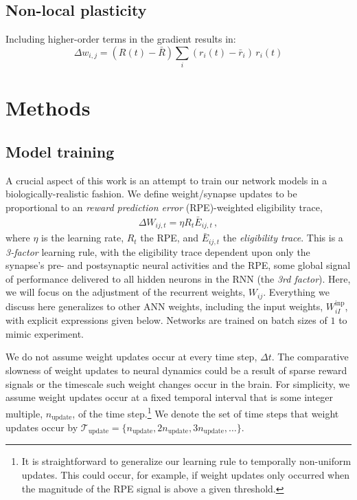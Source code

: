 \documentclass[
  journal=medium,
  manuscript=preprint,
  year=2026
]{aind-preprint}
\begin{document}
\subsection{Non-local plasticity}
Including higher-order terms in the gradient results in:
\begin{equation}
    \Delta w_{i,j} = (R(t)-\bar{R})\sum_i (r_i(t) -\bar{r}_i)\,r_{i}(t)
\end{equation}


\section{Methods}

\subsection{Model training}

A crucial aspect of this work is an attempt to train our network models in a biologically-realistic fashion.
We define weight/synapse updates to be proportional to an \emph{reward prediction error} (RPE)-weighted eligibility trace,
\begin{align}
    \label{eq:methods_weight_adjust}
    \Delta W_{ij,t} = \eta R_t \bar{E}_{ij,t}\,,
\end{align}
where $\eta$ is the learning rate, $R_t$ the RPE, and $\bar{E}_{ij,t}$ the \emph{eligibility trace}.
This is a \emph{3-factor} learning rule, with the eligibility trace dependent upon only the synapse's pre- and postsynaptic neural activities and the RPE, some global signal of performance delivered to all hidden neurons in the RNN (the \emph{3rd factor}).
Here, we will focus on the adjustment of the recurrent weights, $W_{ij}$. 
Everything we discuss here generalizes to other ANN weights, including the input weights, $W_{iI}^\text{inp}$, with explicit expressions given below.
Networks are trained on batch sizes of $1$ to mimic experiment.  

We do not assume weight updates occur at every time step, $\Delta t$.
The comparative slowness of weight updates to neural dynamics could be a result of sparse reward signals or the timescale such weight changes occur in the brain. 
For simplicity, we assume weight updates occur at a fixed temporal interval that is some integer multiple, $n_\text{update}$, of the time step.\footnote{
    It is straightforward to generalize our learning rule to temporally non-uniform updates. 
    This could occur, for example, if weight updates only occurred when the magnitude of the RPE signal is above a given threshold.
}
We denote the set of time steps that weight updates occur by $\mathcal{T}_\text{update} = \{n_\text{update}, 2n_\text{update}, 3n_\text{update}, \ldots \}$.
\end{document}
